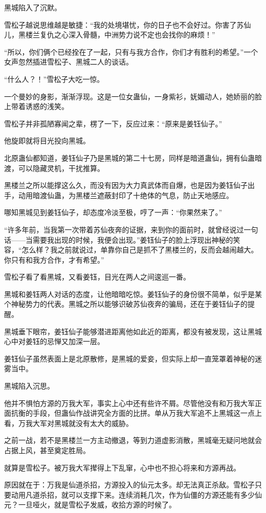 \begin{this_body}
黑城陷入了沉默。

雪松子越说思维越是敏捷：“我的处境堪忧，你的日子也不会好过。你害了苏仙儿，黑楼兰复仇之心深入骨髓，中洲势力说不定也会找你的麻烦！”

“所以，你们俩个已经拴在了一起，只有与我方合作，你们才有胜利的希望。”一个女声忽然插进雪松子、黑城二人的谈话。

“什么人？！”雪松子大吃一惊。

一个曼妙的身影，渐渐浮现。这是一位女蛊仙，一身紫衫，妩媚动人，她娇丽的脸上带着诱惑的浅笑。

雪松子并非孤陋寡闻之辈，楞了一下，反应过来：“原来是姜钰仙子。”

他旋即就将目光投向黑城。

北原蛊仙都知道，姜钰仙子乃是黑城的第二十七房，同样是暗道蛊仙，拥有仙蛊暗渡，可以隐藏灵机，干扰推算。

黑楼兰之所以能撑这么久，而没有因为大力真武体而自爆，也是因为姜钰仙子出手，动用暗渡仙蛊，为黑楼兰遮蔽封印了十绝体的气息，防止天地感应。

哪知黑城见到姜钰仙子，却态度冷淡至极，哼了一声：“你果然来了。”

“许多年前，当我第一次带着苏仙夜奔的证据，来到你的面前时，就曾经说过一句话——当需要我出现的时候，我便会出现。”姜钰仙子的脸上浮现出神秘的笑容，“怎么样？我之前就说过，单靠你自己是抓不了黑楼兰的，反而会越闹越大。你只有和我方合作，才有希望。”

雪松子看了看黑城，又看姜钰，目光在两人之间逡巡一番。

黑城和姜钰两人对话的态度，让他暗暗吃惊。姜钰仙子的身份很不简单，似乎是某个神秘势力的代表。黑城之所以能够识破苏仙夜奔的骗局，还在于姜钰仙子的提醒。

黑城垂下眼帘，姜钰仙子能够潜进距离他如此近的距离，都没有被发现，这让黑城心中对姜钰的忌惮又加深一层。

姜钰仙子虽然表面上是北原散修，是黑城的爱妾，但实际上却一直笼罩着神秘的迷雾当中。

黑城陷入沉思。

他并不惧怕方源的万我大军，事实上心中还有些许不屑。尽管他没有和万我大军正面抗衡的手段，但蛊仙作战讲究全方面的比拼。单从万我大军追不上黑城这一点上看，万我大军对黑城就没有太大的威胁。

之前一战，若不是黑楼兰一方主动撤退，等到力道虚影消散，黑城毫无疑问地就会占据上风，甚至奠定胜局。

就算是雪松子。被万我大军撵得上下乱窜，心中也不担心将来和方源再战。

原因就在于：万我是仙道杀招，方源投入的仙元太多。却无法真正杀敌。雪松子只要动用凡道杀招，就可以支撑下来。连续消耗几次，作为仙僵的方源还能有多少仙元？一旦哑火，就是雪松子发威，收拾方源的时候了。


\end{this_body}
